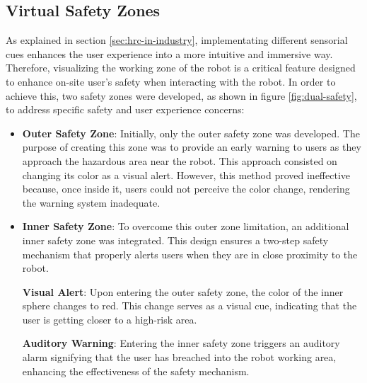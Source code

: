     
\subsection{Virtual Safety Zones}
\label{subsection:virtual-safety-zones} 

As explained in section \ref{sec:hrc-in-industry}, implementating different sensorial cues enhances the user experience into a more intuitive and immersive way. Therefore, visualizing the working zone of the robot is a critical feature designed to enhance on-site user's safety when interacting with the robot. In order to achieve this, two safety zones were developed, as shown in figure \ref{fig:dual-safety}, to address specific safety and user experience concerns: 

\begin{itemize}
\item \textbf{Outer Safety Zone}: Initially, only the outer safety zone was developed. The purpose of creating this zone was to provide an 
early warning to users as they approach the hazardous area near the robot. This approach consisted on changing its color as a visual alert. 
However, this method proved ineffective because, once inside it, users could not perceive the color change, rendering the warning system inadequate.

\item \textbf{Inner Safety Zone}: To overcome this outer zone limitation, an additional inner safety zone was integrated. This design ensures a two-step safety mechanism that properly alerts users when they are in close proximity to the robot.

    \textbf{Visual Alert}: Upon entering the outer safety zone, the color of the inner sphere changes to red. This change serves as a visual cue, indicating that the user is getting closer to a high-risk area.

    \textbf{Auditory Warning}: Entering the inner safety zone triggers an auditory alarm signifying that the user has breached into the robot working area, enhancing the effectiveness of the safety mechanism.
\end{itemize}

